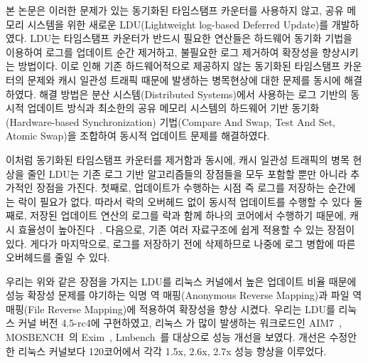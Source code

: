 %
본 논문은 이러한 문제가 있는 동기화된 타임스탬프 카운터를 사용하지 않고,
공유 메모리 시스템을 위한 새로운 LDU(Lightweight log-based Deferred Update)를 개발하였다.
LDU는 타임스탬프 카운터가 반드시 필요한 연산들은 하드웨어 동기화 기법을 이용하여 
로그를 업데이트 순간 제거하고, 불필요한 로그 제거하여 확장성을 향상시키는 방법이다.
이로 인해 기존 하드웨어적으로 제공하지 않는 동기화된 타임스탬프 카운터의 문제와 
캐시 일관성 트래픽 때문에 발생하는 병목현상에 대한 문제를 동시에 해결하였다.
해결 방법은 분산 시스템(Distributed Systems)에서 사용하는 로그 기반의 
동시적 업데이트 방식과 최소한의 공유 메모리 시스템의 하드웨어 기반 동기화(Hardware-based
Synchronization) 기법(Compare And Swap, Test And Set, Atomic Swap)을 조합하여 동시적 업데이트
문제를 해결하였다.

이처럼 동기화된 타임스탬프 카운터를 제거함과 동시에, 캐시 일관성 트래픽의 병목 현상을 줄인
LDU는 기존 로그 기반 알고리즘들의 장점들을 모두 포함할 뿐만 아니라 추가적인 장점을 가진다.
첫째로, 업데이트가 수행하는 시점 즉 로그를 저장하는 순간에는 락이 필요가 없다.
따라서 락의 오버헤드 없이 동시적 업데이트를 수행할 수 있다
둘째로, 저장된 업데이트 연산의 로그를 락과 함께 하나의 코어에서 수행하기 때문에, 
캐시 효율성이 높아진다~\cite{Hendler2010FC}.
다음으로, 기존 여러 자료구조에 쉽게 적용할 수 있는 장점이 있다.
게다가 마지막으로, 로그를 저장하기 전에 삭제하므로 나중에 로그 병합에 따른 오버헤드를 
줄일 수 있다. 

우리는 위와 같은 장점을 가지는 LDU를 리눅스 커널에서 높은 업데이트 비율 때문에 성능 확장성 
문제를 야기하는 익명 역 매핑(Anonymous Reverse Mapping)과 파일 역 매핑(File Reverse Mapping)에
적용하여 확장성을 향상 시켰다.
우리는 LDU를 리눅스 커널 버전 4.5-rc4에 구현하였고, 리눅스 가 많이 발생하는 워크로드인
AIM7~\cite{AIM7Benchmark}, MOSBENCH~\cite{MOSBENCH}의 Exim~\cite{Exim}, Lmbench~\cite{mcvoy1996lmbench}를 
대상으로 성능 개선을 보였다.
개선은 수정안한 리눅스 커널보다 120코어에서 각각 1.5x, 2.6x, 2.7x 성능 향상을 이루었다.

